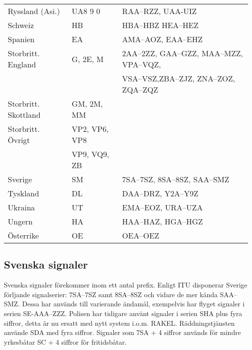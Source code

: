\begin{center}
\begin{footnotesize}
\begin{longtable}{lll}
			Ryssland (Asi.)               & UA8 9 0        & RAA--RZZ, UAA-UIZ                                 \\
			Schweiz                       & HB             & HBA--HBZ HEA--HEZ                                 \\
			Spanien                       & EA             & AMA--AOZ, EAA--EHZ                                \\
			Storbritt. England            & G, 2E, M       & 2AA--2ZZ, GAA--GZZ, MAA--MZZ, VPA--VQZ,           \\
			                              &                & VSA--VSZ,ZBA--ZJZ, ZNA--ZOZ, ZQA--ZQZ             \\
			Storbritt. Skottland          & GM, 2M, MM     &                                                   \\
			Storbritt. Övrigt             & VP2, VP6, VP8  &                                                   \\
			                              & VP9, VQ9, ZB   &                                                   \\
			Sverige                       & SM             & 7SA--7SZ, 8SA--8SZ, SAA--SMZ                      \\
			Tyskland                      & DL             & DAA--DRZ, Y2A--Y9Z                                \\
			Ukraina                       & UT             & EMA--EOZ, URA--UZA                                \\
			Ungern                        & HA             & HAA--HAZ, HGA--HGZ                                \\
			Österrike                     & OE             & OEA--OEZ\\
		\end{longtable}
	\end{footnotesize}
\end{center}

\subsection{Svenska signaler}

Svenska signaler förekommer inom ett antal prefix. Enligt ITU disponerar Sverige förljande signalserier: 7SA--7SZ samt 8SA--8SZ och vidare de mer kända SAA--SMZ. Dessa har används till varierande ändamål, exempelvis har flyget signaler i serien SE-AAA--ZZZ. Polisen har tidigare använt signaler i serien SHA plus fyra siffror, detta är nu ersatt med nytt system i.o.m. RAKEL. Räddningstjänsten använde SDA med fyra siffror. Signaler som 7SA + 4 siffror används för mindre yrkesbåtar SC + 4 siffror för fritidsbåtar.


